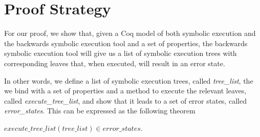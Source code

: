 \section{Proof Strategy}
For our proof, we show that, given a Coq model of both symbolic execution and the backwards symbolic execution tool and a set of properties, 
the backwards symbolic execution tool will give us a list of symbolic execution trees with corresponding leaves that, when executed, will result in an error state.

In other words, we define a list of symbolic execution trees, called \textit{tree\_list}, the we bind with a set of properties and a method to execute the relevant leaves, called \textit{execute\_tree\_list},
and show that it leads to a set of error states, called \textit{error\_states}. This can be expressed as the following theorem

\begin{theorem}
\begin{theorem}
$execute\_tree\_list (tree\_list) \in error\_states$.
\end{theorem}
\end{theorem}
